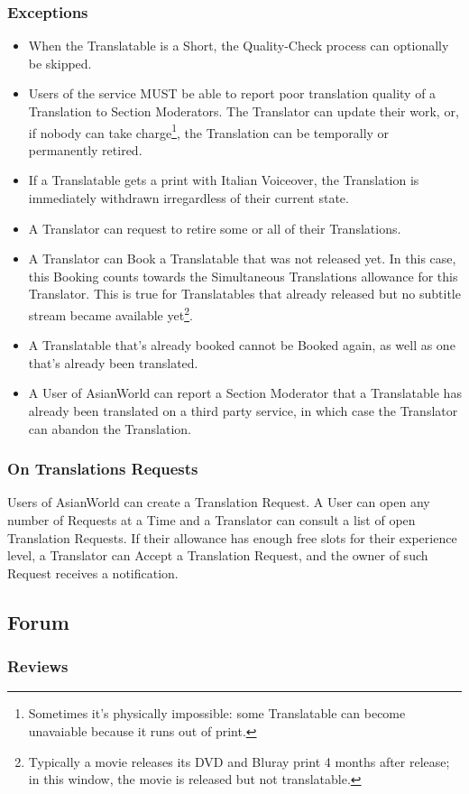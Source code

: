 \documentclass[12pt]{book}
\begin{document}
	\subsubsection{Exceptions}
	\begin{itemize}
		\item When the Translatable is a Short, the Quality-Check process can optionally be skipped.
		\item Users of the service MUST be able to report poor translation quality of a Translation to Section Moderators. The Translator can update their work, or, if nobody can take charge\footnote{Sometimes it's physically impossible: some Translatable can become unavaiable because it runs out of print.}, the Translation can be temporally or permanently retired.
		\item If a Translatable gets a print with Italian Voiceover, the Translation is immediately withdrawn irregardless of their current state. 
		\item A Translator can request to retire some or all of their Translations.
		\item A Translator can Book a Translatable that was not released yet. In this case, this Booking counts towards the Simultaneous Translations allowance for this Translator. This is true for Translatables that already released but no subtitle stream became available yet\footnote{Typically a movie releases its DVD and Bluray print 4 months after release; in this window, the movie is released but not translatable.}.
		\item A Translatable that's already booked cannot be Booked again, as well as one that's already been translated.
		\item A User of AsianWorld can report a Section Moderator that a Translatable has already been translated on a third party service, in which case the Translator can abandon the Translation.
	\end{itemize}

	\subsubsection{On Translations Requests}
	Users of AsianWorld can create a Translation Request. A User can open any number of Requests at a Time and a Translator can consult a list of open Translation Requests. If their allowance has enough free slots for their experience level, a Translator can Accept a Translation Request, and the owner of such Request receives a notification. 
	
	\subsection{Forum}
	
	\subsubsection{Reviews}
	\printbibliography
	\printindex
\end{document}
